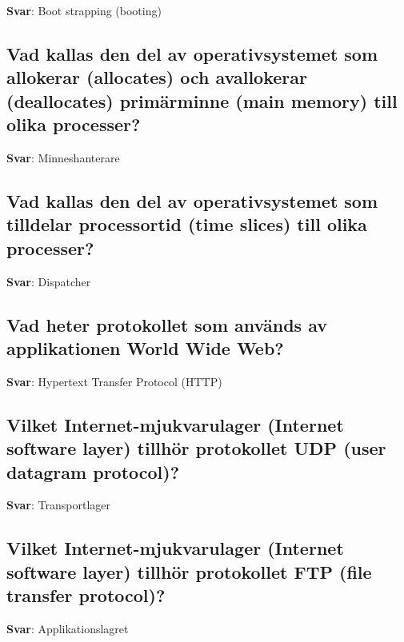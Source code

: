 \documentclass[a4paper,11pt,oneside]{article}
\begin{document}
\begin{sloppypar}
\textbf{Svar}: Boot strapping (booting)



\subsection{Vad kallas den del av operativsystemet som allokerar (allocates) och avallokerar (deallocates) prim\"arminne (main memory) till olika processer?}

\label{q:16:sa:sv:True}

\textbf{Svar}: Minneshanterare



\subsection{Vad kallas den del av operativsystemet som tilldelar processortid (time slices) till olika processer?}

\label{q:17:sa:sv:True}

\textbf{Svar}: Dispatcher



\subsection{Vad heter protokollet som anv\"ands av applikationen World Wide Web?}

\label{q:18:sa:sv:True}

\textbf{Svar}: Hypertext Transfer Protocol (HTTP)



\subsection{Vilket Internet-mjukvarulager (Internet software layer) tillh\"or protokollet UDP (user datagram protocol)?}

\label{q:19:sa:sv:True}

\textbf{Svar}: Transportlager



\subsection{Vilket Internet-mjukvarulager (Internet software layer) tillh\"or protokollet FTP (file transfer protocol)?}

\label{q:20:sa:sv:True}

\textbf{Svar}: Applikationslagret




\end{sloppypar}
\end{document}
